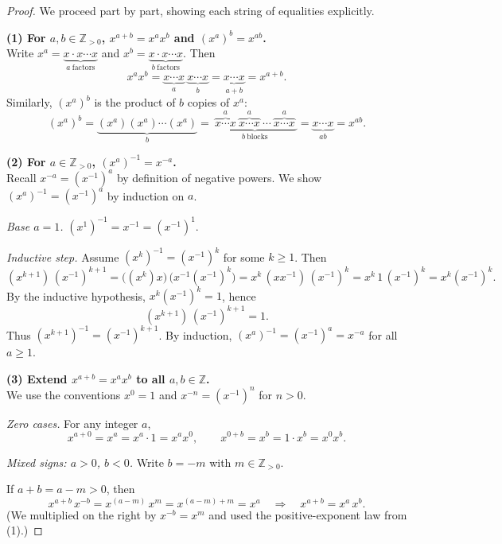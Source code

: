 \documentclass[12pt]{article}
\theoremstyle{definition}
\begin{document}
\begin{proof}
We proceed part by part, showing each string of equalities explicitly.

\dotfill

\noindent\textbf{(1) For $a,b\in\mathbb{Z}_{>0}$, $x^{a+b}=x^a x^b$ and $(x^a)^b=x^{ab}$.}\\

\noindent
Write $x^a=\underbrace{x\cdot x\cdots x}_{a\ \text{factors}}$ and $x^b=\underbrace{x\cdot x\cdots x}_{b\ \text{factors}}$.
Then
\[
x^a x^b
=\underbrace{x\cdots x}_{a}\ \underbrace{x\cdots x}_{b}
=\underbrace{x\cdots x}_{a+b}
=x^{a+b}.
\]
Similarly, $(x^a)^b$ is the product of $b$ copies of $x^a$:
\[
(x^a)^b=\underbrace{(x^a)(x^a)\cdots(x^a)}_{b}
=\underbrace{\ \overbrace{x\cdots x}^{a}\ \overbrace{x\cdots x}^{a}\ \cdots\ \overbrace{x\cdots x}^{a}\ }_{b\ \text{blocks}}
=\underbrace{x\cdots x}_{ab}
= x^{ab}.
\]

\dotfill

\noindent\textbf{(2) For $a\in\mathbb{Z}_{>0}$, $(x^a)^{-1}=x^{-a}$.}\\

\noindent
Recall $x^{-a}=(x^{-1})^a$ by definition of negative powers. We show $(x^a)^{-1}=(x^{-1})^a$ by induction on $a$.

\noindent
\emph{Base $a=1$.} $(x^1)^{-1}=x^{-1}=(x^{-1})^1$.

\noindent
\emph{Inductive step.} Assume $(x^k)^{-1}=(x^{-1})^k$ for some $k\ge 1$. Then
\[
(x^{k+1})\,(x^{-1})^{k+1}
= \bigl((x^{k})x\bigr)\,\bigl(x^{-1}(x^{-1})^{k}\bigr)
= x^{k}\,(xx^{-1})\,(x^{-1})^{k}
= x^{k}\,1\,(x^{-1})^{k}
= x^{k}(x^{-1})^{k}.
\]
By the inductive hypothesis, $x^{k}(x^{-1})^{k}=1$, hence
\[
(x^{k+1})\,(x^{-1})^{k+1}=1.
\]
Thus $(x^{k+1})^{-1}=(x^{-1})^{k+1}$. By induction, $(x^a)^{-1}=(x^{-1})^a=x^{-a}$ for all $a\ge 1$.

\dotfill

\noindent\textbf{(3) Extend $x^{a+b}=x^ax^b$ to all $a,b\in\mathbb{Z}$.}\\

\noindent
We use the conventions $x^0=1$ and $x^{-n}=(x^{-1})^n$ for $n>0$.

\noindent
\emph{Zero cases.} For any integer $a$,
\[
x^{a+0}=x^{a}=x^{a}\cdot 1=x^a x^0,
\qquad
x^{0+b}=x^{b}=1\cdot x^{b}=x^0 x^b.
\]

\noindent
\emph{Mixed signs: $a>0$, $b<0$.}
Write $b=-m$ with $m\in\mathbb{Z}_{>0}$.

If $a+b=a-m>0$, then
\[
x^{a+b}\,x^{-b}
= x^{(a-m)}\,x^{m}
= x^{(a-m)+m}
= x^{a}
\quad\Longrightarrow\quad
x^{a+b} = x^{a}\,x^{b}.
\]
(We multiplied on the right by $x^{-b}=x^{m}$ and used the positive-exponent law from (1).)


\end{proof}
\end{document}
